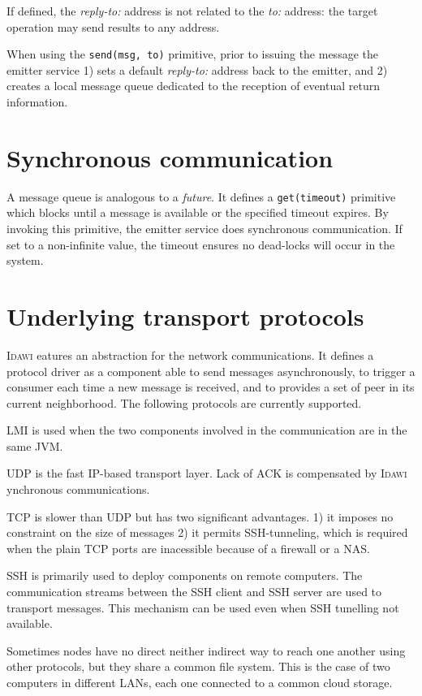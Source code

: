 \documentclass{article}
\newcommand{\idawi}[1]{\textsc{Idawi}\xspace}
\begin{document}
If defined, the {\em reply-to:} address is not related to the {\em to:} address: the target operation may send results to any address.

When using the \texttt{send(msg, to)} primitive, prior to issuing the message the emitter service 1) sets a default {\em reply-to:} address back to the emitter, and 2)
creates a local message queue dedicated to the reception of eventual return information.

\section{Synchronous communication}
A message queue is analogous to a {\em future}. It defines a \texttt{get(timeout)} primitive which blocks until a message is available or the specified timeout expires. By invoking this primitive, the emitter service does synchronous communication. If set to a non-infinite value, the timeout ensures no dead-locks will occur in the system.


\section{Underlying transport protocols}
\idawi features an abstraction for the network communications. It defines a protocol driver as a component able to send messages asynchronously, to trigger a consumer each time a new message is received, and to provides a set of peer in its current neighborhood.
The following protocols are currently supported.

LMI is used when the two components involved in the communication are in the same JVM.

UDP
is the fast IP-based transport layer. Lack of ACK is compensated by \idawi synchronous communications.

TCP
is slower than UDP but has two significant advantages. 1) it imposes no constraint on the size of messages 2) it permits SSH-tunneling, which is required when the plain TCP ports are inacessible because of a firewall or a NAS.

SSH
is primarily used to deploy components on remote computers. The communication streams between the SSH client and SSH server are used to transport messages. This mechanism can be used even when SSH tunelling not available.

Sometimes nodes have no direct neither indirect way to reach one another using other protocols, but they share a common file system. This is the case of two computers in different LANs, each one connected to a common cloud storage.
\end{document}
